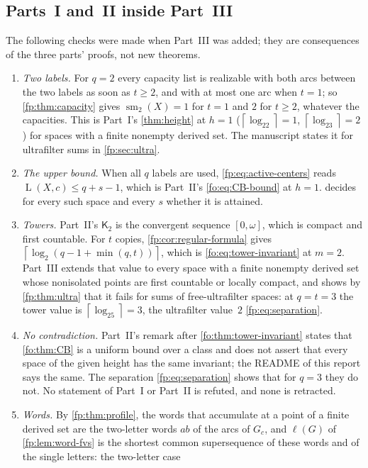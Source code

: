 \documentclass[11pt,letterpaper]{article}
\numberwithin{equation}{section}
\theoremstyle{definition}
\theoremstyle{remark}
\theoremstyle{definition}
\newcommand{\ceil}[1]{\left\lceil#1\right\rceil}
\newcommand{\layers}{\operatorname{L}}
\newcommand{\Tw}{\mathsf K}
\begin{document}
\subsection{Parts~I and~II inside Part~III}
\label{fp:sec:crosswalk}
The following checks were made when Part~III was added; they are
consequences of the three parts' proofs, not new theorems.
\begin{enumerate}
\item \emph{Two labels.} For $q=2$ every capacity list is realizable with
both arcs between the two labels as soon as $t\ge2$, and with at most one arc
when $t=1$; so \cref{fp:thm:capacity} gives $\operatorname{sm}_2(X)=1$ for
$t=1$ and $2$ for $t\ge2$, whatever the capacities. This is Part~I's
\cref{thm:height} at $h=1$ ($\ceil{\log_22}=1$, $\ceil{\log_23}=2$) for
spaces with a finite nonempty derived set. The manuscript states it for
ultrafilter sums in \cref{fp:sec:ultra}.
\item \emph{The upper bound.} When all $q$ labels are used,
\eqref{fp:eq:active-centers} reads $\layers(X,c)\le q+s-1$, which is Part~II's
\eqref{fo:eq:CB-bound} at $h=1$.  decides for every
such space and every $s$ whether it is attained.
\item \emph{Towers.} Part~II's $\Tw_2$ is the convergent sequence
$[0,\omega]$, which is compact and first countable. For $t$ copies,
\cref{fp:cor:regular-formula} gives
$\ceil{\log_2(q-1+\min(q,t))}$, which is \eqref{fo:eq:tower-invariant} at
$m=2$. Part~III extends that value to every space with a finite nonempty
derived set whose nonisolated points are first countable or locally compact,
and shows by \cref{fp:thm:ultra} that it fails for sums of free-ultrafilter
spaces: at $q=t=3$ the tower value is $\ceil{\log_25}=3$, the ultrafilter
value~$2$ \eqref{fp:eq:separation}.
\item \emph{No contradiction.} Part~II's remark after
\cref{fo:thm:tower-invariant} states that \cref{fo:thm:CB} is a uniform bound
over a class and does not assert that every space of the given height has
the same invariant; the README of this report says the same. The separation
\eqref{fp:eq:separation} shows that for $q=3$ they do not. No statement of
Part~I or Part~II is refuted, and none is retracted.
\item \emph{Words.} By \cref{fp:thm:profile}, the words that accumulate at a
point of a finite derived set are the two-letter words $ab$ of the arcs of
$G_c$, and $\ell(G)$ of \cref{fp:lem:word-fvs} is the shortest common
supersequence of these words and of the single letters: the two-letter case

\end{enumerate}
\end{document}
